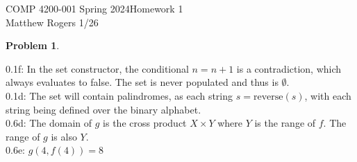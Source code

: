 \documentclass[12pt]{article}
\newtheorem{problem}{Problem}
\begin{document}
\noindent COMP 4200-001 Spring 2024\hfill Homework 1\\
Matthew Rogers \hfill1/26

\begin{problem}\end{problem}
0.1f: In the set constructor, the conditional $n=n+1$ is a contradiction, which always evaluates to false. The set is never populated and thus is $\emptyset$.\\

0.1d: The set will contain palindromes, as each string $s=\text{reverse}(s)$, with each string being defined over the binary alphabet.\\

0.6d: The domain of $g$ is the cross product $X\times Y$ where $Y$ is the range of $f$. The range of $g$ is also $Y$.\\

0.6e: $g(4,f(4))=8$
\end{document}
